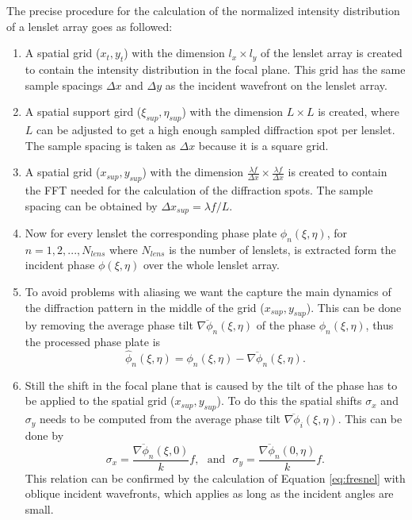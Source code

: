 The precise procedure for the calculation of the normalized intensity distribution of a lenslet array goes as followed:
\begin{enumerate}
	\item 
	A spatial grid ($x_t,y_t$)  with the dimension $l_x \times l_y$ of the lenslet array is created to contain the intensity distribution in the focal plane. This grid has the same sample spacings $\Delta x$ and $\Delta y$ as the incident wavefront on the lenslet array.
	\item
	A spatial support gird ($\xi_{sup},\eta_{sup}$) with the dimension $L\times L$ is created, where $L$ can be adjusted to get a high enough sampled diffraction spot per lenslet. The sample spacing is taken as $\Delta x$ because it is a square grid.
	\item
	A spatial grid ($x_{sup},y_{sup}$) with the dimension $\frac{\lambda f}{\Delta x} \times \frac{\lambda f}{\Delta x}$ is created to contain the FFT needed for the calculation of the diffraction spots. The sample spacing can be obtained by $\Delta x_{sup} = \lambda f/L$.  
	\item
	Now for every lenslet the corresponding phase plate $\phi_n(\xi,\eta)$, for $n = 1,2,...,N_{lens}$ where $N_{lens}$ is the number of lenslets, is extracted form the incident phase $\phi(\xi,\eta)$ over the whole lenslet array.
	\item
	To avoid problems with aliasing we want the capture the main dynamics of the diffraction pattern in the middle of the grid ($x_{sup},y_{sup}$). This can be done by removing the average phase tilt $\overline{\nabla \phi_n}(\xi,\eta)$ of the phase $\phi_n(\xi,\eta)$, thus the processed phase plate is
	\begin{equation}
	\hat{\phi}_n(\xi,\eta) = \phi_n(\xi,\eta) - \overline{\nabla \phi_n}(\xi,\eta).
	\end{equation}
	\item
	Still the shift in the focal plane that is caused by the tilt of the phase has to be applied to the spatial grid ($x_{sup},y_{sup}$). To do this the spatial shifts $\sigma_x$ and $\sigma_y$ needs to be computed from the average phase tilt $\overline{\nabla \phi_i}(\xi,\eta)$. This can be done by
	\begin{equation}
	\sigma_x = \frac{\overline{\nabla \phi_n}(\xi,0)}{k}f,~~~\text{and}~~~\sigma_y = \frac{\overline{\nabla \phi_n}(0,\eta)}{k}f.
	\end{equation}
	This relation can be confirmed by the calculation of Equation \eqref{eq:fresnel} with oblique incident wavefronts, which applies as long as the incident angles are small.

\end{enumerate}
